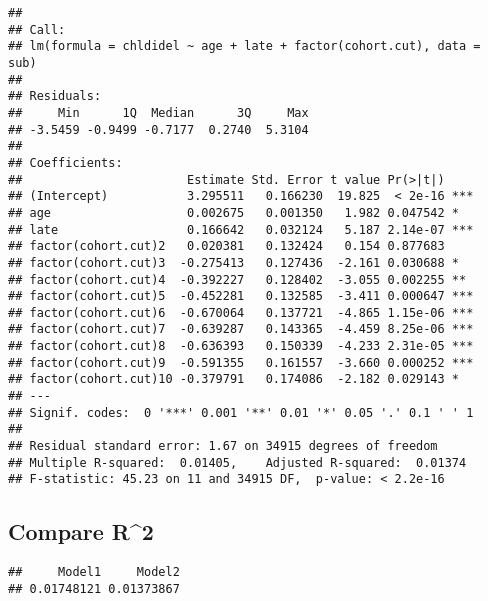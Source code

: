 \documentclass[]{article}
\newenvironment{Shaded}{\begin{snugshade}}{\end{snugshade}}
\newcommand{\DataTypeTok}[1]{\textcolor[rgb]{0.13,0.29,0.53}{#1}}
\newcommand{\KeywordTok}[1]{\textcolor[rgb]{0.13,0.29,0.53}{\textbf{#1}}}
\newcommand{\NormalTok}[1]{#1}
\newcommand{\OperatorTok}[1]{\textcolor[rgb]{0.81,0.36,0.00}{\textbf{#1}}}
\begin{document}
\begin{verbatim}
## 
## Call:
## lm(formula = chldidel ~ age + late + factor(cohort.cut), data = sub)
## 
## Residuals:
##     Min      1Q  Median      3Q     Max 
## -3.5459 -0.9499 -0.7177  0.2740  5.3104 
## 
## Coefficients:
##                       Estimate Std. Error t value Pr(>|t|)    
## (Intercept)           3.295511   0.166230  19.825  < 2e-16 ***
## age                   0.002675   0.001350   1.982 0.047542 *  
## late                  0.166642   0.032124   5.187 2.14e-07 ***
## factor(cohort.cut)2   0.020381   0.132424   0.154 0.877683    
## factor(cohort.cut)3  -0.275413   0.127436  -2.161 0.030688 *  
## factor(cohort.cut)4  -0.392227   0.128402  -3.055 0.002255 ** 
## factor(cohort.cut)5  -0.452281   0.132585  -3.411 0.000647 ***
## factor(cohort.cut)6  -0.670064   0.137721  -4.865 1.15e-06 ***
## factor(cohort.cut)7  -0.639287   0.143365  -4.459 8.25e-06 ***
## factor(cohort.cut)8  -0.636393   0.150339  -4.233 2.31e-05 ***
## factor(cohort.cut)9  -0.591355   0.161557  -3.660 0.000252 ***
## factor(cohort.cut)10 -0.379791   0.174086  -2.182 0.029143 *  
## ---
## Signif. codes:  0 '***' 0.001 '**' 0.01 '*' 0.05 '.' 0.1 ' ' 1
## 
## Residual standard error: 1.67 on 34915 degrees of freedom
## Multiple R-squared:  0.01405,    Adjusted R-squared:  0.01374 
## F-statistic: 45.23 on 11 and 34915 DF,  p-value: < 2.2e-16
\end{verbatim}

\hypertarget{compare-r2}{%
\subsection{Compare R\^{}2}\label{compare-r2}}

\begin{Shaded}
\end{Shaded}

\begin{verbatim}
##     Model1     Model2 
## 0.01748121 0.01373867
\end{verbatim}
\end{document}
